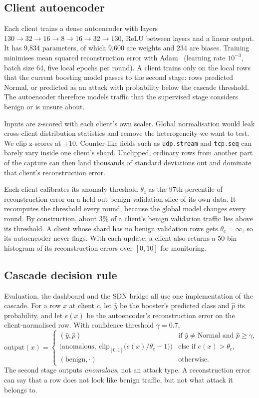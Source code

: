 \subsection{Client autoencoder}
\label{sec:ae}
Each client trains a dense autoencoder with layers $130\!\to\!32\!\to\!16\!\to\!8\!\to\!16\!\to\!32\!\to\!130$, ReLU between layers and a linear output. It has 9,834 parameters, of which 9,600 are weights and 234 are biases. Training minimises mean squared reconstruction error with Adam~\cite{kingma2015} (learning rate $10^{-3}$, batch size 64, five local epochs per round). A client trains only on the local rows that the current boosting model passes to the second stage: rows predicted Normal, or predicted as an attack with probability below the cascade threshold. The autoencoder therefore models traffic that the supervised stage considers benign or is unsure about.

Inputs are z-scored with each client's own scaler. Global normalisation would leak cross-client distribution statistics and remove the heterogeneity we want to test. We clip z-scores at $\pm10$. Counter-like fields such as \texttt{udp.stream} and \texttt{tcp.seq} can barely vary inside one client's shard. Unclipped, ordinary rows from another part of the capture can then land thousands of standard deviations out and dominate that client's reconstruction error.

Each client calibrates its anomaly threshold $\theta_c$ as the 97th percentile of reconstruction error on a held-out benign validation slice of its own data. It recomputes the threshold every round, because the global model changes every round. By construction, about 3\% of a client's benign validation traffic lies above its threshold. A client whose shard has no benign validation rows gets $\theta_c=\infty$, so its autoencoder never flags. With each update, a client also returns a 50-bin histogram of its reconstruction errors over $[0,10]$ for monitoring.

\subsection{Cascade decision rule}
Evaluation, the dashboard and the SDN bridge all use one implementation of the cascade. For a row $x$ at client $c$, let $\hat y$ be the booster's predicted class and $\hat p$ its probability, and let $e(x)$ be the autoencoder's reconstruction error on the client-normalised row. With confidence threshold $\gamma=0.7$,
\begin{equation}
\mathrm{output}(x)=
\begin{cases}
(\hat y,\hat p) & \text{if } \hat y\neq\text{Normal and } \hat p\ge\gamma,\\
\bigl(\text{anomalous},\ \mathrm{clip}_{[0,1]}\bigl(e(x)/\theta_c-1\bigr)\bigr) & \text{else if } e(x)>\theta_c,\\
(\text{benign},\cdot) & \text{otherwise.}
\end{cases}
\label{eq:cascade}
\end{equation}
The second stage outputs \emph{anomalous}, not an attack type. A reconstruction error can say that a row does not look like benign traffic, but not what attack it belongs to.

